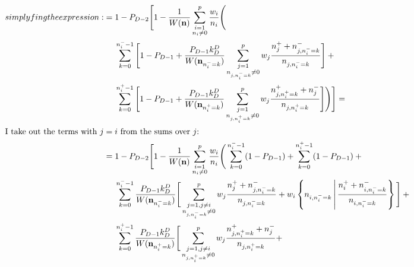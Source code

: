 \documentclass[a4paper]{article}
\theoremstyle{definition}
\begin{document}
\begin{align}
{        simplyfing the expression:}
        &= 1 - P_{D-2} \Bigg[
            1 - \frac 1 {W(\mathbf n)}
            \sum_{\substack{i=1 \\ n_i \ne 0}}^p  \frac {w_i} {n_i} \Bigg( \notag \\
                & \phantom{{}={}}
                \sum_{k=0}^{n^-_i - 1} \Bigg[
                    1 - P_{D-1} +
                    \frac{P_{D-1} k^D_D} {W(\mathbf n_{n^-_i=k})}
                    \sum_{\substack{j = 1 \\ n_{j,n^-_i=k}\ne 0}}^p w_j
                    \frac {n^+_j + n^-_{j,n^-_i=k}} {n_{j,n^-_i=k}}
                \Bigg] + {} \notag \\
                & \phantom{{}={}}
                \sum_{k=0}^{n^+_i - 1} \Bigg[
                    1 - P_{D-1} +
                    \frac{P_{D-1} k^D_D} {W(\mathbf n_{n^+_i=k})}
                    \sum_{\substack{j=1 \\ n_{j,n^+_i=k}\ne 0}}^p w_j
                    \frac {n^+_{j, n^+_i=k} + n^-_j} {n_{j, n^+_i=k}}
                \Bigg]
            \Bigg)
        \Bigg] = \notag \\
        \intertext{I take out the terms with $j=i$ from the sums over $j$:}
        &= 1 - P_{D-2} \Bigg[
            1 - \frac 1 {W(\mathbf n)}
            \sum_{\substack{i=1 \\ n_i \ne 0}}^p  \frac {w_i} {n_i} \Bigg(
                \sum_{k=0}^{n^-_i - 1} (1 - P_{D-1}) +
                \sum_{k=0}^{n^+_i - 1} (1 - P_{D-1}) + {} \notag \\
                & \phantom{{}={}}
                \sum_{k=0}^{n^-_i - 1}
                \frac {P_{D-1} k^D_D} {W(\mathbf n_{n^-_i=k})} \Bigg[
                    \sum_{\substack{j=1,j \ne i \\ n_{j,n^-_i=k} \ne 0}}^p w_j
                    \frac {n^+_j + n^-_{j,n^-_i=k}} {n_{j,n^-_i=k}} +
                    w_i \left\{
                        n_{i,n^-_i=k} \,\middle|\,
                        \frac {n^+_i + n^-_{i,n^-_i=k}} {n_{i,n^-_i=k}}
                    \right\}
                \Bigg] + {} \notag \\
                & \phantom{{}={}}
                \sum_{k=0}^{n^+_i - 1}
                \frac {P_{D-1} k^D_D} {W(\mathbf n_{n^+_i=k})} \Bigg[
                    \sum_{\substack{j=1,j \ne i \\ n_{j,n^+_i=k} \ne 0}}^p w_j
                    \frac {n^+_{j,n^+_i=k} + n^-_j} {n_{j,n^+_i=k}} +

\end{align}
\end{document}
